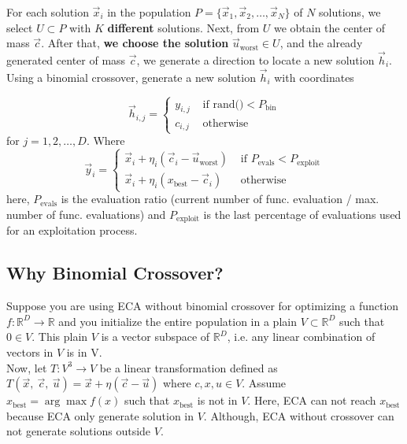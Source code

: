 \documentclass[12pt,letterpape]{article}
\begin{document}
For each solution $\vec{x}_i $ in the population $P = \{ \vec{x}_1, \vec{x}_2, \ldots, \vec{x}_{N} \} $ of $N$ 
solutions, we select $U \subset P $ with $K$ \textbf{different} solutions. Next, 
from $U$ we obtain the center of mass $\vec{c}$. After that, \textbf{we choose the solution} $\vec{u}_{\text{worst}} \in U$,  
and the already generated center of mass $\vec{c}$, we generate a direction 
to locate a new solution $ \vec{h}_i$. Using a binomial crossover, generate a new solution $\vec{h}_{i}$ with coordinates

%
\begin{equation}
	\vec{h}_{i,j} = 
	\begin{cases}
		y_{i,j} & \text{ if rand()} < P_{\text{bin}}\\
		c_{i,j} & \text{ otherwise}
	\end{cases}
	\label{eqn:newSol}
\end{equation}
% 
for $j = 1,2,\ldots,D$. Where 
%
\begin{equation}
	\vec{y}_i = 
	\begin{cases}
		\vec{x}_i + \eta _{i} ( \vec{c}_i - \vec{u}_{ \text{worst} } ) 
		       & \text{ if } P_{\text{evals}} < P_{\text{exploit}} \\
		\vec{x}_i + \eta _{i} ( x_{\text{best}} - \vec{c}_i)
		       & \text{ otherwise}
	\end{cases}
	\label{eqn:vcu}
\end{equation}
%
here, $ P_{\text{evals}}$ is the evaluation ratio (current number of func. evaluation / max. number of func. evaluations) and  $P_{\text{exploit}}$ is the last percentage of evaluations used for an exploitation process.
%


\subsection{Why Binomial Crossover?} %
\label{sub:why_binomial_crossover_}

Suppose you are using ECA without binomial crossover for optimizing a function $f:\mathbb{R}^D \to \mathbb{R}$ and you initialize the entire population in a plain $V \subset \mathbb{R}^D $ such that $0 \in V$. This plain $V$ is a vector subspace of $\mathbb{R}^D$, i.e. any linear combination of vectors in $V$ is in V.\\

Now, let $T:V^3 \to V$ be a linear transformation defined as $ T(\vec{x},\ \vec{c},\ \vec{u}) = \vec{x} + \eta ( \vec{c} - \vec{u} )$ where $c,x,u \in V$. Assume $x_\text{best} = \arg \max f(x)$ such that $x_\text{best} $ is not in $V$. Here, ECA can not reach $x_\text{best}$ because ECA only generate solution in $V$. Although, ECA without crossover can not generate solutions outside $V$.
\end{document}
